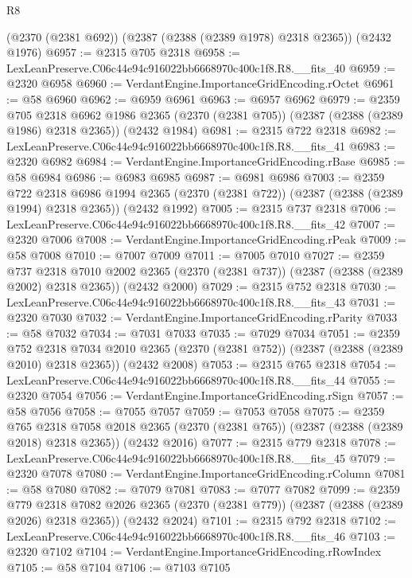 \begin{lexlean}{R8}
\begin{coremodule}
    (@2370 (@2381 @692))
    (@2387 (@2388 (@2389 @1978) @2318 @2365))
    (@2432 @1976)
@6957 := @2315 @705 @2318
@6958 := LexLeanPreserve.C06c44e94c916022bb6668970c400c1f8.R8.__fits_40
@6959 := @2320 @6958
@6960 := VerdantEngine.ImportanceGridEncoding.rOctet
@6961 := @58 @6960
@6962 := @6959 @6961
@6963 := @6957 @6962
@6979 := @2359
    @705
    @2318
    @6962
    @1986
    @2365
    (@2370 (@2381 @705))
    (@2387 (@2388 (@2389 @1986) @2318 @2365))
    (@2432 @1984)
@6981 := @2315 @722 @2318
@6982 := LexLeanPreserve.C06c44e94c916022bb6668970c400c1f8.R8.__fits_41
@6983 := @2320 @6982
@6984 := VerdantEngine.ImportanceGridEncoding.rBase
@6985 := @58 @6984
@6986 := @6983 @6985
@6987 := @6981 @6986
@7003 := @2359
    @722
    @2318
    @6986
    @1994
    @2365
    (@2370 (@2381 @722))
    (@2387 (@2388 (@2389 @1994) @2318 @2365))
    (@2432 @1992)
@7005 := @2315 @737 @2318
@7006 := LexLeanPreserve.C06c44e94c916022bb6668970c400c1f8.R8.__fits_42
@7007 := @2320 @7006
@7008 := VerdantEngine.ImportanceGridEncoding.rPeak
@7009 := @58 @7008
@7010 := @7007 @7009
@7011 := @7005 @7010
@7027 := @2359
    @737
    @2318
    @7010
    @2002
    @2365
    (@2370 (@2381 @737))
    (@2387 (@2388 (@2389 @2002) @2318 @2365))
    (@2432 @2000)
@7029 := @2315 @752 @2318
@7030 := LexLeanPreserve.C06c44e94c916022bb6668970c400c1f8.R8.__fits_43
@7031 := @2320 @7030
@7032 := VerdantEngine.ImportanceGridEncoding.rParity
@7033 := @58 @7032
@7034 := @7031 @7033
@7035 := @7029 @7034
@7051 := @2359
    @752
    @2318
    @7034
    @2010
    @2365
    (@2370 (@2381 @752))
    (@2387 (@2388 (@2389 @2010) @2318 @2365))
    (@2432 @2008)
@7053 := @2315 @765 @2318
@7054 := LexLeanPreserve.C06c44e94c916022bb6668970c400c1f8.R8.__fits_44
@7055 := @2320 @7054
@7056 := VerdantEngine.ImportanceGridEncoding.rSign
@7057 := @58 @7056
@7058 := @7055 @7057
@7059 := @7053 @7058
@7075 := @2359
    @765
    @2318
    @7058
    @2018
    @2365
    (@2370 (@2381 @765))
    (@2387 (@2388 (@2389 @2018) @2318 @2365))
    (@2432 @2016)
@7077 := @2315 @779 @2318
@7078 := LexLeanPreserve.C06c44e94c916022bb6668970c400c1f8.R8.__fits_45
@7079 := @2320 @7078
@7080 := VerdantEngine.ImportanceGridEncoding.rColumn
@7081 := @58 @7080
@7082 := @7079 @7081
@7083 := @7077 @7082
@7099 := @2359
    @779
    @2318
    @7082
    @2026
    @2365
    (@2370 (@2381 @779))
    (@2387 (@2388 (@2389 @2026) @2318 @2365))
    (@2432 @2024)
@7101 := @2315 @792 @2318
@7102 := LexLeanPreserve.C06c44e94c916022bb6668970c400c1f8.R8.__fits_46
@7103 := @2320 @7102
@7104 := VerdantEngine.ImportanceGridEncoding.rRowIndex
@7105 := @58 @7104
@7106 := @7103 @7105

\end{coremodule}
\end{lexlean}
